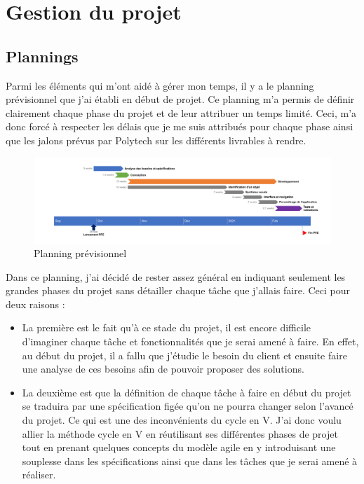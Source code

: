 \documentclass[UTF8]{EPURapport}
\begin{document}
\chapter{Gestion du projet}

\section{Plannings}

Parmi les éléments qui m'ont aidé à gérer mon temps, il y a le planning prévisionnel que j'ai établi en début de projet. Ce planning m'a permis de définir clairement chaque phase du projet et de leur attribuer un temps limité. Ceci, m'a donc forcé à respecter les délais que je me suis attribués pour chaque phase ainsi que les jalons prévus par Polytech sur les différents livrables à rendre. \\

\begin{figure}[h!]
\centering
  \includegraphics[width=\textwidth]{images/PlanningPrev.png}
  \caption{Planning prévisionnel}
  \label{fig:planningprev}
\end{figure}

Dans ce planning, j'ai décidé de rester assez général en indiquant seulement les grandes phases du projet sans détailler chaque tâche que j'allais faire. Ceci pour deux raisons : 

\begin{itemize}
  \item La première est le fait qu'à ce stade du projet, il est encore difficile d'imaginer chaque tâche et fonctionnalités que je serai amené à faire. En effet, au début du projet, il a fallu que j'étudie le besoin du client et ensuite faire une analyse de ces besoins afin de pouvoir proposer des solutions.
  \item La deuxième est que la définition de chaque tâche à faire en début du projet se traduira par une spécification figée qu'on ne pourra changer selon l'avancé du projet. Ce qui est une des inconvénients du cycle en V. J'ai donc voulu allier la méthode cycle en V en réutilisant ses différentes phases de projet tout en prenant quelques concepts du modèle agile en y introduisant une souplesse dans les spécifications ainsi que dans les tâches que je serai amené à réaliser.
\end{itemize}
\end{document}

